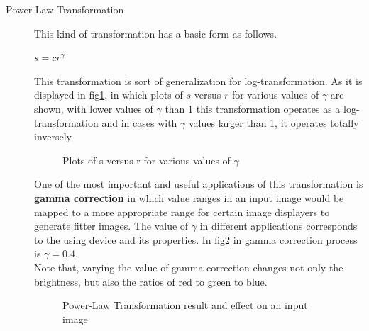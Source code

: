 \documentclass{article}
\begin{document}
\begin{description}
 \item [Power-Law Transformation] This kind of transformation has a basic form as follows.\\
\begin{center}
$s = cr^\gamma$
\end{center} 
This transformation is sort of generalization for log-transformation. As it is displayed in fig\ref{fig:powerDiag}, in which plots of $s$ versus $r$ for various
values of $\gamma$ are shown, with lower values of $\gamma$ than 1 this transformation operates as a log-transformation and in cases with $\gamma$ values larger than 1, it operates totally inversely.

\begin{figure}
\center
{}
\caption{Plots of s versus r for various values of $\gamma$}
\label{fig:powerDiag}
\end{figure}

 One of the most important and useful applications of this transformation is \textbf{gamma correction} in which value ranges in an input image would be mapped to a more appropriate range for certain image displayers to generate fitter images. The value of $\gamma$ in different applications corresponds to the using device and its properties. In fig\ref{fig:gamma0.4} in gamma correction process is $\gamma = 0.4$.\\
 Note that,  varying the value of gamma correction changes not only the brightness, but also the ratios of red to green to blue.\\
 
 \begin{figure}
 \center
 \caption{Power-Law Transformation result and effect on an input image}
 \label{fig:gamma0.4}
 \end{figure}



\end{description}
\end{document}
